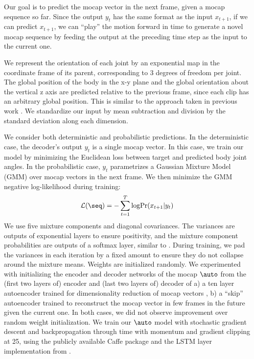\documentclass[10pt,twocolumn,letterpaper]{article}
\begin{document}
Our goal is to predict the mocap vector in the next frame, given a mocap sequence so far. Since the output $y_{t}$ has the same format as  the input $x_{t+1}$, if we can predict $x_{t+1}$, we can ``play'' the motion forward in time to generate a novel mocap sequence by feeding the output at the preceding time step as the input to the current one.

We represent the orientation of each joint by an exponential map in the coordinate frame of its parent, corresponding to 3 degrees of freedom per joint. The global position of the body in the x-y plane and the global orientation about the vertical z axis are predicted relative to the previous frame, since each clip has an arbitrary global position. This is similar to the approach taken in previous work \cite{thr-mhmub-06}. We standardize our input by mean subtraction and division by the standard deviation along each dimension. 



We consider both deterministic and probabilistic predictions. In the deterministic case, the decoder's output $y_t$ is a single mocap vector.  In this case, we train our model by minimizing the Euclidean loss between target and predicted body joint angles. In the probabilistic case, $y_t$  parametrizes  a Gaussian Mixture Model (GMM) over mocap vectors in the next frame.  We then  minimize the GMM negative log-likelihood during training:
\begin{equation}
 \mathcal{L}(\seq) = - \displaystyle\sum_{t=1}^T\mathrm{log}\mathrm{Pr}(x_{t+1}|y_t)
\end{equation}
We use five mixture components and diagonal covariances. The variances are outputs of  exponential layers to ensure  positivity, and the mixture component probabilities are outputs of a softmax layer, similar to \cite{DBLP:journals/corr/Graves13}. During training, we  pad the variances in each iteration by a fixed amount to ensure they do not collapse around the mixture means.
   Weights are initialized randomly. We experimented with initializing the encoder and decoder networks of the mocap $\auto$ from the (first two layers of) encoder and (last two layers of) decoder of a) a ten layer autoencoder trained for dimensionality reduction of mocap  vectors \cite{citeulike:778023}, 
  b) a ``skip'' autoencoder  trained to reconstruct the  mocap vector in few frames in the future given the current one. In both cases, we did not observe improvement over random weight initialization.  We train our $\auto$ model with stochastic gradient descent and backpropagation through time \cite{Williams95gradient-basedlearning} with momentum and gradient clipping at 25, using the publicly available Caffe package \cite{Jia13caffe} and the LSTM layer  implementation from \cite{DBLP:journals/corr/DonahueHGRVSD14}. 
  
\end{document}
